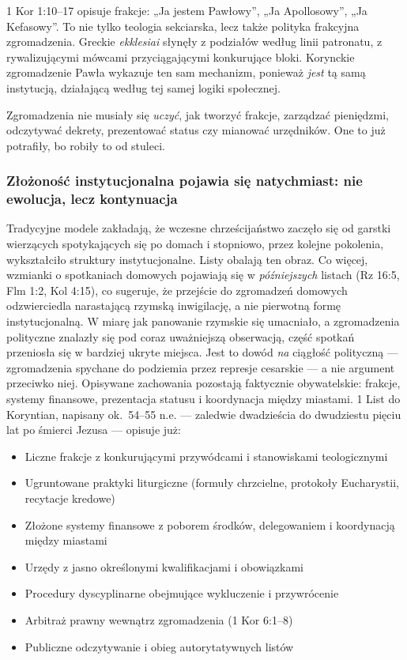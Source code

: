 1 Kor 1:10–17 opisuje frakcje: „Ja jestem Pawłowy”, „Ja Apollosowy”, „Ja Kefasowy”.
To nie tylko teologia sekciarska, lecz także polityka frakcyjna zgromadzenia.
Greckie \textit{ekklesiai} słynęły z podziałów według linii patronatu, z rywalizującymi mówcami przyciągającymi konkurujące bloki.
Korynckie zgromadzenie Pawła wykazuje ten sam mechanizm, ponieważ \emph{jest} tą samą instytucją, działającą według tej samej logiki społecznej.

Zgromadzenia nie musiały się \emph{uczyć}, jak tworzyć frakcje, zarządzać pieniędzmi, odczytywać dekrety, prezentować status czy mianować urzędników.
One to już potrafiły, bo robiły to od stuleci.

\subsubsection{Złożoność instytucjonalna pojawia się natychmiast: nie ewolucja, lecz kontynuacja}\label{subsubsec:institutional-complexity-appears-instantly-not-evolution-but-continuation}

\label{subsubsec:institutional-complexity-appears-instantly-not-evolution-but-continuation}

Tradycyjne modele zakładają, że wczesne chrześcijaństwo zaczęło się od garstki wierzących spotykających się po domach i stopniowo, przez kolejne pokolenia, wykształciło struktury instytucjonalne.
Listy obalają ten obraz.
Co więcej, wzmianki o spotkaniach domowych pojawiają się w \emph{późniejszych} listach (Rz 16:5, Flm 1:2, Kol 4:15), co sugeruje, że przejście do zgromadzeń domowych odzwierciedla narastającą rzymską inwigilację, a nie pierwotną formę instytucjonalną.
W miarę jak panowanie rzymskie się umacniało, a zgromadzenia polityczne znalazły się pod coraz uważniejszą obserwacją, część spotkań przeniosła się w bardziej ukryte miejsca.
Jest to dowód \emph{na} ciągłość polityczną — zgromadzenia spychane do podziemia przez represje cesarskie — a nie argument przeciwko niej.
Opisywane zachowania pozostają faktycznie obywatelskie: frakcje, systemy finansowe, prezentacja statusu i koordynacja między miastami.
1 List do Koryntian, napisany ok.~54–55 n.e. — zaledwie dwadzieścia do dwudziestu pięciu lat po śmierci Jezusa — opisuje już:
\begin{itemize}
    \item Liczne frakcje z konkurującymi przywódcami i stanowiskami teologicznymi
    \item Ugruntowane praktyki liturgiczne (formuły chrzcielne, protokoły Eucharystii, recytacje kredowe)
    \item Złożone systemy finansowe z poborem środków, delegowaniem i koordynacją między miastami
    \item Urzędy z jasno określonymi kwalifikacjami i obowiązkami
    \item Procedury dyscyplinarne obejmujące wykluczenie i przywrócenie
    \item Arbitraż prawny wewnątrz zgromadzenia (1 Kor 6:1–8)
    \item Publiczne odczytywanie i obieg autorytatywnych listów
\end{itemize}

